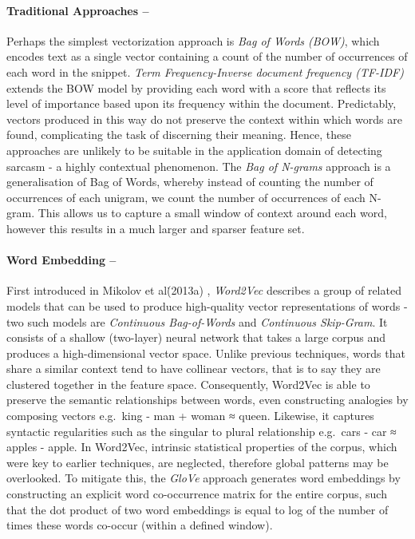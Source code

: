 \documentclass[12pt,a4paper]{article}
\begin{document}
\paragraph{Traditional Approaches --}
\noindent Perhaps the simplest vectorization approach is \textit{Bag of Words (BOW)}, which encodes text as a single vector containing a count of the number of occurrences of each word in the snippet. \textit{Term Frequency-Inverse document frequency (TF-IDF)} \cite{robertson1976relevance} extends the BOW model by providing each word with a score that reflects its level of importance based upon its frequency within the document. Predictably, vectors produced in this way do not preserve the context within which words are found, complicating the task of discerning their meaning. Hence, these approaches are unlikely to be suitable in the application domain of detecting sarcasm - a highly contextual phenomenon. The \textit{Bag of N-grams} approach is a generalisation of Bag of Words, whereby instead of counting the number of occurrences of each unigram, we count the number of occurrences of each N-gram. This allows us to capture a small window of context around each word, however this results in a much larger and sparser feature set.
\vfill
\paragraph{Word Embedding --}
\noindent First introduced in Mikolov et al\. (2013a) \cite{mikolov2013efficient}, \textit{Word2Vec} describes a group of related models that can be used to produce high-quality vector representations of words - two such models are \textit{Continuous Bag-of-Words} and \textit{Continuous Skip-Gram}. It consists of a shallow (two-layer) neural network that takes a large corpus and produces a high-dimensional vector space. Unlike previous techniques, words that share a similar context tend to have collinear vectors, that is to say they are clustered together in the feature space. Consequently, Word2Vec is able to preserve the semantic relationships between words, even constructing analogies by composing vectors e.g.\ king - man + woman ≈ queen. Likewise, it captures syntactic regularities such as the singular to plural relationship e.g.\ cars - car ≈ apples - apple. In Word2Vec, intrinsic statistical properties of the corpus, which were key to earlier techniques, are neglected, therefore global patterns may be overlooked. To mitigate this, the \textit{GloVe} \cite{pennington2014glove} approach generates word embeddings by constructing an explicit word co-occurrence matrix for the entire corpus, such that the dot product of two word embeddings is equal to log of the number of times these words co-occur (within a defined window).
\end{document}
